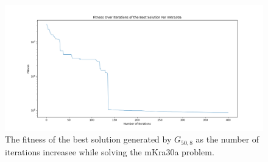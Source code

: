 \begin{figure}[h!]
\centering
\begin{adjustwidth}{-0.45in}{}
	\includegraphics[scale=0.5]{./images/chap07-rd/gwo-only-mkra30a-best-solution-fitness-graph.png}
\end{adjustwidth}
\caption{The fitness of the best solution generated by $G_{50,8}$ as the number of iterations increasee while solving the mKra30a problem.}
\label{approach-gwo-mkra30a-best-solution-fitness-over-time}
\end{figure}

